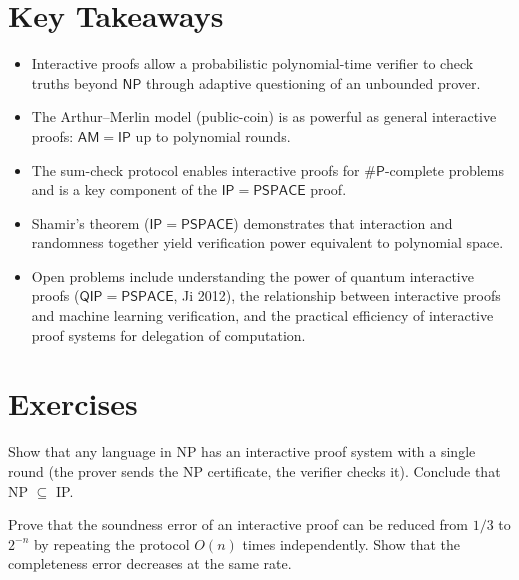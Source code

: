 \section*{Key Takeaways}
\begin{itemize}
\item Interactive proofs allow a probabilistic polynomial-time verifier to check truths beyond $\mathsf{NP}$ through adaptive questioning of an unbounded prover.
\item The Arthur--Merlin model (public-coin) is as powerful as general interactive proofs: $\mathsf{AM} = \mathsf{IP}$ up to polynomial rounds.
\item The sum-check protocol enables interactive proofs for $\#\mathsf{P}$-complete problems and is a key component of the $\mathsf{IP} = \mathsf{PSPACE}$ proof.
\item Shamir's theorem ($\mathsf{IP} = \mathsf{PSPACE}$) demonstrates that interaction and randomness together yield verification power equivalent to polynomial space.
\item Open problems include understanding the power of quantum interactive proofs ($\mathsf{QIP} = \mathsf{PSPACE}$, Ji 2012), the relationship between interactive proofs and machine learning verification, and the practical efficiency of interactive proof systems for delegation of computation.
\end{itemize}

\section{Exercises}
\label{sec:ip:exercises}

\begin{exercise}[Basic]
Show that any language in NP has an interactive proof system with a single round (the prover sends the NP certificate, the verifier checks it). Conclude that NP $\subseteq$ IP.
\end{exercise}

\begin{exercise}[Basic]
Prove that the soundness error of an interactive proof can be reduced from $1/3$ to $2^{-n}$ by repeating the protocol $O(n)$ times independently. Show that the completeness error decreases at the same rate.
\end{exercise}

